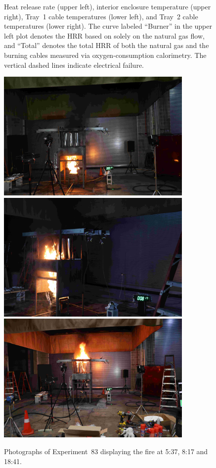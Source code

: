 \begin{figure}[H]
\caption[HRR and temperatures of Experiment 83]{Heat release rate (upper left), interior enclosure temperature (upper right), Tray~1 cable temperatures (lower left), and Tray~2 cable temperatures (lower right). The curve labeled ``Burner'' in the upper left plot denotes the HRR based on solely on the natural gas flow, and ``Total'' denotes the total HRR of both the natural gas and the burning cables measured via oxygen-consumption calorimetry. The vertical dashed lines indicate electrical failure.}
\label{fig:Test_83}
\end{figure}

\begin{figure}[p]
\centering
\includegraphics[height=2.50in]{../FIGURES/Test_83_Photo_1} \\ \vspace{0.1in}
\includegraphics[height=2.50in]{../FIGURES/Test_83_Photo_2} \\ \vspace{0.1in}
\includegraphics[height=2.50in]{../FIGURES/Test_83_Photo_3}
\caption[Photographs of Experiment~83]{Photographs of Experiment~83 displaying the fire at 5:37, 8:17 and 18:41.}
\label{fig:Test_83_photos}
\end{figure}




